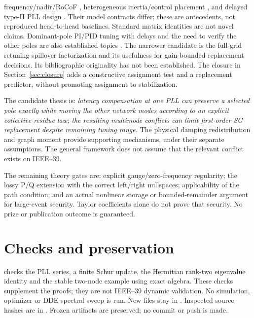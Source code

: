 \documentclass[11pt]{article}
\begin{document}
frequency/nadir/RoCoF \cite{paganini}, heterogeneous inertia/control
placement \cite{pagnier}, and delayed type-II PLL design \cite{wilson}.
Their model contracts differ; these are antecedents, not reproduced
head-to-head baselines. Standard matrix identities are not novel claims.
Dominant-pole PI/PID tuning with delays and the need to verify the
other poles are also established topics \cite{zitek,zhang}.
The narrower candidate is the full-grid retuning spillover factorization
and its usefulness for gain-bounded replacement decisions.
Its bibliographic originality has not been established. The closure in
Section~\ref{sec:closure} adds a constructive assignment test and a
replacement predictor, without promoting assignment to stabilization.

The candidate thesis is: \emph{latency compensation at one PLL can
preserve a selected pole exactly while moving the other network modes
according to an explicit collective-residue law; the resulting
multimode conflicts can limit first-order SG replacement despite
remaining tuning range.} The physical damping redistribution and
graph moment provide supporting mechanisms, under their separate
assumptions. The general framework does not assume that the relevant
conflict exists on IEEE--39.

The remaining theory gates are: explicit gauge/zero-frequency
regularity; the lossy P/Q extension with the correct left/right
nullspaces; applicability of the path condition; and an actual nonlinear
storage or bounded-remainder argument for large-event security.
Taylor coefficients alone do not prove that security. No prize or
publication outcome is guaranteed.

\appendix
\section{Checks and preservation}
 checks the PLL series, a finite Schur update,
the Hermitian rank-two eigenvalue identity and the stable two-node
example using exact algebra. These checks supplement the proofs;
they are not IEEE--39 dynamic validation. No simulation, optimizer
or DDE spectral sweep is run. New files stay in
.
Inspected source hashes are in .
Frozen artifacts are preserved; no commit or push is made.
\end{document}
